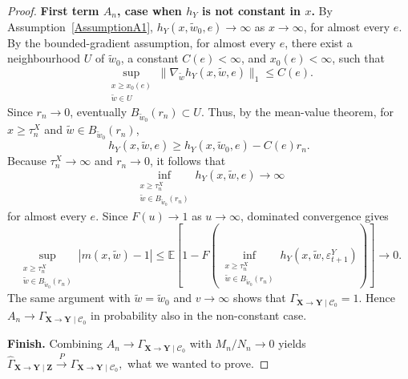 \documentclass[a4paper,11pt]{article}
\begin{document}
\begin{proof}
\textbf{First term $A_n$, case when \(h_Y\) is not constant in \(x\).}   By
Assumption~\ref{AssumptionA1}, \(h_Y(x,\tilde w_0,e)\to\infty\) as \(x\to\infty\), for
almost every \(e\). By the bounded-gradient assumption, for almost every \(e\), there exist
a neighbourhood \(U\) of \(\tilde w_0\), a constant \(C(e)<\infty\), and \(x_0(e)<\infty\),
such that
\[
    \sup_{\substack{x\ge x_0(e)\\ \tilde w\in U}}
    \|\nabla_{\tilde w} h_Y(x,\tilde w,e)\|_1\le C(e).
\]
Since \(r_n\to0\), eventually \(B_{\tilde w_0}(r_n)\subset U\). Thus, by the mean-value
theorem, for \(x\ge\tau_n^X\) and \(\tilde w\in B_{\tilde w_0}(r_n)\),
\[
    h_Y(x,\tilde w,e)
    \ge
    h_Y(x,\tilde w_0,e)-C(e)r_n.
\]
Because \(\tau_n^X\to\infty\) and \(r_n\to0\), it follows that
\[
    \inf_{\substack{x\ge\tau_n^X\\ \tilde w\in B_{\tilde w_0}(r_n)}}
    h_Y(x,\tilde w,e)
    \longrightarrow \infty
\]
for almost every \(e\). Since \(F(u)\to1\) as \(u\to\infty\), dominated convergence gives
\[
    \sup_{\substack{x\ge\tau_n^X\\ \tilde w\in B_{\tilde w_0}(r_n)}}
    |m(x,\tilde w)-1|
    \le
    \mathbb E\!\left[
        1-
        F\!\left(
            \inf_{\substack{x\ge\tau_n^X\\ \tilde w\in B_{\tilde w_0}(r_n)}}
            h_Y(x,\tilde w,\varepsilon^Y_{t+1})
        \right)
    \right]
    \longrightarrow 0.
\]
The same argument with \(\tilde w=\tilde w_0\) and \(v\to\infty\) shows that
\(\Gamma_{\mathbf X\to\mathbf Y\mid\mathcal C_0}=1\). Hence \(A_n\to
\Gamma_{\mathbf X\to\mathbf Y\mid\mathcal C_0}\) in probability also in the non-constant
case.

\textbf{Finish.} Combining \(A_n\to\Gamma_{\mathbf X\to\mathbf Y\mid\mathcal C_0}\) with \(M_n/N_n\to 0\) yields \(
    \hat{\Gamma}_{\mathbf X\to\mathbf Y\mid\mathbf Z}
    \overset{P}{\longrightarrow}
    \Gamma_{\mathbf X\to\mathbf Y\mid\mathcal C_0},
\) what we wanted to prove. 



\end{proof}
\end{document}
